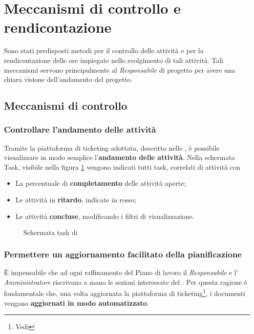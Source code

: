 \section{Meccanismi di controllo e rendicontazione}
Sono stati predisposti metodi per il controllo delle attività e per la rendicontazione delle ore impiegate nello svolgimento di tali attività. Tali meccanismi servono principalmente al \emph{Responsabile} di progetto per avere una chiara visione dell'andamento del progetto.
\subsection{Meccanismi di controllo}
\subsubsection{Controllare l'andamento delle attività}

Tramite la piattaforma di ticketing adottata, descritto nelle \NormeDiProgetto, è possibile visualizzare in modo semplice l'\textbf{andamento delle attività}.
Nella schermata Task, visibile nella figura \ref{teamworkpmtask} vengono indicati tutti task, correlati di attività con
\begin{itemize}
\item La percentuale di \textbf{completamento} delle attività aperte;
\item Le attività in \textbf{ritardo}, indicate in rosso;
\item Le attività \textbf{concluse}, modificando i filtri di visualizzazione.
\end{itemize}
 
\begin{figure}[H]
\caption{Schermata task di  \label{teamworkpmtask}}
\end{figure}


\subsubsection{Permettere un aggiornamento facilitato della pianificazione}
\label{script}
È impensabile che ad ogni raffinamento del Piano di lavoro il \emph{Responsabile} e l' \emph{Amministratore} riscrivano a mano le sezioni interessate del \PianoDiProgetto.
Per questa ragione è fondamentale che, una volta aggiornata la piattaforma di ticketing\footnote{Vedi \NormeDiProgetto}, i documenti vengano \textbf{aggiornati in modo automatizzato}.

